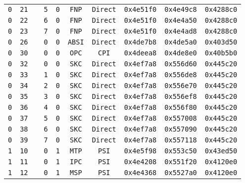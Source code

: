 \begin{adjustwidth}{5ex}{1ex}
\begin{tabular}{cccccccccc}
		\texttt{0} & \texttt{21} & & \texttt{5} & \texttt{0} & \texttt{FNP} & \texttt{Direct} & \texttt{0x4e51f0} & \texttt{0x4e49c8} & \texttt{0x4288c0} \\
		\texttt{0} & \texttt{22} & & \texttt{6} & \texttt{0} & \texttt{FNP} & \texttt{Direct} & \texttt{0x4e51f0} & \texttt{0x4e4a50} & \texttt{0x4288c0} \\
		\texttt{0} & \texttt{23} & & \texttt{7} & \texttt{0} & \texttt{FNP} & \texttt{Direct} & \texttt{0x4e51f0} & \texttt{0x4e4ad8} & \texttt{0x4288c0} \\
		\texttt{0} & \texttt{26} & & \texttt{0} & \texttt{0} & \texttt{ABSI} & \texttt{Direct} & \texttt{0x4de7b8} & \texttt{0x4de5a0} & \texttt{0x403d50} \\
		\texttt{0} & \texttt{30} & & \texttt{0} & \texttt{0} & \texttt{OPC} & \texttt{CPI} & \texttt{0x4deea8} & \texttt{0x4de8e0} & \texttt{0x40b5b0} \\
		\texttt{0} & \texttt{32} & & \texttt{0} & \texttt{0} & \texttt{SKC} & \texttt{Direct} & \texttt{0x4ef7a8} & \texttt{0x556d60} & \texttt{0x445c20} \\
		\texttt{0} & \texttt{33} & & \texttt{1} & \texttt{0} & \texttt{SKC} & \texttt{Direct} & \texttt{0x4ef7a8} & \texttt{0x556de8} & \texttt{0x445c20} \\
		\texttt{0} & \texttt{34} & & \texttt{2} & \texttt{0} & \texttt{SKC} & \texttt{Direct} & \texttt{0x4ef7a8} & \texttt{0x556e70} & \texttt{0x445c20} \\
		\texttt{0} & \texttt{35} & & \texttt{3} & \texttt{0} & \texttt{SKC} & \texttt{Direct} & \texttt{0x4ef7a8} & \texttt{0x556ef8} & \texttt{0x445c20} \\
		\texttt{0} & \texttt{36} & & \texttt{4} & \texttt{0} & \texttt{SKC} & \texttt{Direct} & \texttt{0x4ef7a8} & \texttt{0x556f80} & \texttt{0x445c20} \\
		\texttt{0} & \texttt{37} & & \texttt{5} & \texttt{0} & \texttt{SKC} & \texttt{Direct} & \texttt{0x4ef7a8} & \texttt{0x557008} & \texttt{0x445c20} \\
		\texttt{0} & \texttt{38} & & \texttt{6} & \texttt{0} & \texttt{SKC} & \texttt{Direct} & \texttt{0x4ef7a8} & \texttt{0x557090} & \texttt{0x445c20} \\
		\texttt{0} & \texttt{39} & & \texttt{7} & \texttt{0} & \texttt{SKC} & \texttt{Direct} & \texttt{0x4ef7a8} & \texttt{0x557118} & \texttt{0x445c20} \\
		\texttt{1} & \texttt{10} & & \texttt{0} & \texttt{1} & \texttt{MTP} & \texttt{PSI} & \texttt{0x4e5f98} & \texttt{0x553c50} & \texttt{0x43ed50} \\
		\texttt{1} & \texttt{11} & & \texttt{0} & \texttt{1} & \texttt{IPC} & \texttt{PSI} & \texttt{0x4e4208} & \texttt{0x551f20} & \texttt{0x4120e0} \\
		\texttt{1} & \texttt{12} & & \texttt{0} & \texttt{1} & \texttt{MSP} & \texttt{PSI} & \texttt{0x4e4368} & \texttt{0x5527a0} & \texttt{0x4120e0} \\
	\end{tabular}
\end{adjustwidth}

